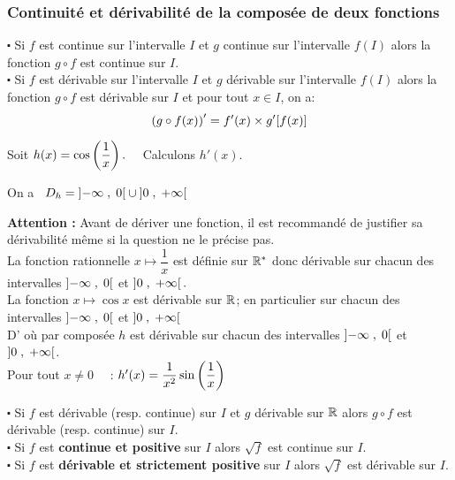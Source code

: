 \subsubsection*{Continuité et dérivabilité de la composée de deux fonctions}
\begin{property}
$ \centerdot $ Si $ f $ est continue sur l'intervalle $ I $ et $ g $ continue sur l'intervalle $ f(I) $ alors la fonction $ g\circ f $ est continue sur  $ I $.\\
$ \centerdot $ Si $ f $ est dérivable sur l'intervalle $ I $ et $ g $ dérivable sur l'intervalle $ f(I) $ alors la fonction $ g\circ f $ est dérivable sur $ I $ et pour tout $ x\in I $, on a:
\[\left(g\circ f(x)\right)'= f'(x)\times g'[f(x)] \]
\end{property}
\begin{example} 
Soit $h(x)= \cos \left(\dfrac{1}{x}\right).\quad$ Calculons  $h'(x) $.

On a   $\;\; D_{h}= \left]-\infty \;,\; 0\right[\cup \left]0 \;,\; +\infty\right[ $

\textbf{Attention :}  Avant de dériver une fonction, il est recommandé de justifier sa dérivabilité même si la question ne le précise pas.\\
La fonction rationnelle $ x\mapsto \dfrac{1}{x} $ est  définie sur $ \mathbb{R}^* $ donc dérivable sur chacun des intervalles $\left]-\infty \;,\; 0\right[ $ et $\left]0 \;,\; +\infty\right[. $\\
La fonction $ x\mapsto \cos x $ est dérivable sur $ \mathbb{R} $; en particulier sur chacun des intervalles $\left]-\infty \;,\; 0\right[ $ et $\left]0 \;,\; +\infty\right[ $\\ D' où par  composée $ h $ est dérivable  sur chacun des intervalles $\left]-\infty \;,\; 0\right[ $ et $\left]0 \;,\; +\infty\right[ $.\\
Pour tout   $ x\neq 0 \quad$   :    $h'(x)=\dfrac{1}{x^{2}}\sin\left(\dfrac{1}{x}\right) $ 

\end{example}
\begin{corollary}
$ \centerdot $ Si $ f $ est dérivable  (resp. continue) sur $ I $  et $ g $ dérivable sur $ \mathbb{R} $  alors $ g \circ f $ est dérivable (resp. continue) sur $ I. $\\
$ \centerdot $ Si $ f $ est \textbf{ continue et positive} sur $ I $ alors $ \sqrt{f} $ est continue sur $ I $.\\
$ \centerdot $ Si $ f $ est \textbf{ dérivable et strictement positive } sur $ I $ alors $ \sqrt{f} $ est dérivable sur $ I $.
\end{corollary}


